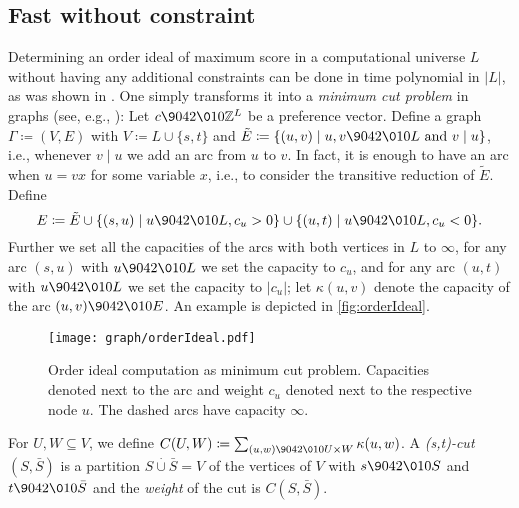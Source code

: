 \documentclass[11pt,oneside,english]{amsart}
\makeatletter
\numberwithin{equation}{section}
\numberwithin{figure}{section}
\theoremstyle{plain}
\theoremstyle{definition}
\theoremstyle{definition}
\theoremstyle{remark}
\theoremstyle{plain}
\theoremstyle{plain}
\theoremstyle{plain}
\theoremstyle{problem@}
\newcounter{problem}
\makeatother
\begin{document}
\subsection{Fast without constraint}
\label{sec:fast-with-constr}

Determining an order ideal of maximum
score in a computational universe \(L\) without having any additional
constraints can be done in time
polynomial in $\lvert L \rvert $, as was shown in
\cite{picard1976maximal}.
One simply transforms it into a \emph{minimum cut problem} in
graphs (see, e.g., \cite{schrijver1986theory}): Let $c {\9042\010} {\mathbb{Z}}^L$ be a
preference vector. Define a
graph $\Gamma \coloneqq (V,E)$ with $V \coloneqq L \cup \{s,t\}$ and $\tilde E \coloneqq  \{ (u,v)
\mid u,v {\9042\010} L\text{ and } v \mid u \}$, i.e., whenever $v \mid u$ we add an arc from
$u$ to $v$.
In fact, it is enough to have an arc when \(u = v x\) for some variable \(x\), i.e., to consider the transitive reduction of $\tilde E$.
Define \[E \coloneqq  \tilde E \cup \{ (s,u) \mid u {\9042\010} L, c_u > 0\} \cup
\{ (u,t) \mid u {\9042\010} L, c_u < 0 \}.\] Further we set all the capacities of the
arcs with both vertices in $L$ to $\infty$, for any arc $(s,u)$ with $u {\9042\010} L$
we set the capacity to $c_u$, and for any arc $(u,t)$ with $u {\9042\010} L$ we set
the capacity to $\lvert c_u \rvert $; let $\kappa(u,v)$ denote the capacity of the arc
$(u,v) {\9042\010} E$. An example is depicted in \autoref{fig:orderIdeal}.
\begin{figure}
  \centering
\texttt{[image: graph/orderIdeal.pdf]}
\caption[Order ideal computation as minimum cut problem]{\label{fig:orderIdeal}Order ideal computation as minimum cut problem.
Capacities denoted next to the arc and weight $c_u$ denoted next to the
respective node $u$. The dashed arcs have capacity $\infty$.}
\end{figure}

For $U,W \subseteq V$, we define $C(U,W) \coloneqq  \sum_{(u,w) {\9042\010} U \times W} \kappa(u,w)$. 
A \emph{(s,t)-cut} $(S,\bar S)$ is a partition $S \stackrel{\cdot}{\cup} \bar S=V$ of the vertices of $V$ with $s {\9042\010} S$ and $t {\9042\010} \bar S$ and the \emph{weight} of the cut is $C(S,\bar S)$. 
\end{document}

